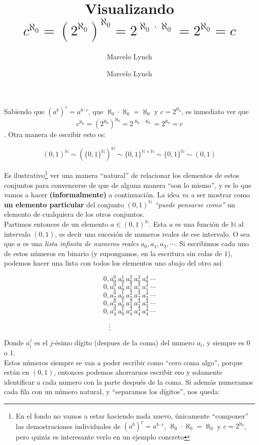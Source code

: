 \documentclass[10pt,a4paper]{article}
\author{Marcelo Lynch}
\title{\vspace{-1.6cm}Visualizando $c^{\aleph_0} = (2^{\aleph_0})^{\aleph_0} = 2^{\aleph_0 \cdot \aleph_0} = 2^{\aleph_0} = c$ }
\author{Marcelo Lynch}
\date{}
\newcommand{\N}{\mathbb{N}}
\begin{document}
\maketitle

Sabiendo que $(a^b)^c = a^{b \cdot c}$, que $\aleph_0 \cdot \aleph_0 = \aleph_0$ y $c = 2^{\aleph_0}$, es inmediato ver que \[ c^{\aleph_0} = (2^{\aleph_0})^{\aleph_0} = 2^{\aleph_0 \cdot \aleph_0} = 2^{\aleph_0} = c \]. Otra manera de escribir esto es:

\[ (0,1)^\N \sim (\{0, 1\}^\N)^{\N} \sim \{ 0,1 \}^{\N \times \N} \sim \{0,1\}^\N \sim (0,1) \]

Es ilustrativo\footnote{En el fondo no vamos a estar haciendo nada nuevo, únicamente ``componer'' las demostraciones individuales de $(a^b)^c = a^{b \cdot c}$, $\aleph_0 \cdot \aleph_0 = \aleph_0$ y $c = 2^{\aleph_0}$, pero quizás es interesante verlo en un ejemplo concreto} ver una manera ``natural'' de relacionar los elementos de estos conjuntos para convencerse de que de alguna manera ``son lo mismo'', y es lo que vamos a hacer \textbf{(informalmente)} a continuación.  La idea va a ser mostrar como \textbf{un elemento particular} del conjunto $(0,1)^\N$ \textit{``puede pensarse como''} un elemento de cualquiera de los otros conjuntos.\\

Partimos entonces de un elemento $a \in (0,1)^{\N}$. Esta $a$ es una función de $\N$ al intervalo $(0,1)$, es decir una sucesión de numeros reales de ese intervalo. O sea que $a$ es una \textit{lista infinita de numeros reales} $a_0, a_1, a_2, \cdots$. Si escribimos cada uno de estos números en binario (y supongamos, en la escritura sin colas de $1$), podemos hacer una lista con todos los elementos uno abajo del otro así:

\[ 0,a_0^0\ a_0^1\ a_0^2\ a_0^3\ a_0^4\ \cdots \]
\[ 0,a_1^0\ a_0^1\ a_1^2\ a_1^3\ a_1^4\ \cdots \]
\[ 0,a_2^0\ a_0^1\ a_2^2\ a_2^3\ a_2^4\ \cdots \]
\[ 0,a_3^0\ a_0^1\ a_3^2\ a_3^3\ a_3^4\ \cdots \]
\[ 0,a_4^0\ a_0^1\ a_4^2\ a_4^3\ a_4^4\ \cdots \]
\[\ \ \vdots\ \hspace{30px}  \hspace{30px} \]
Donde $a_i^j$ es el $j$-ésimo dígito (despues de la coma) del numero $a_i$, y siempre es $0$ o $1$.\\

Estos números siempre se van a poder escribir como ``cero coma algo'', porque están en $(0,1)$, entonces podemos ahorrarnos escribir eso y solamente identificar a cada numero con la parte después de la coma. Si además numeramos cada fila con un número natural, y ``separamos los dígitos'', nos queda:
\end{document}
